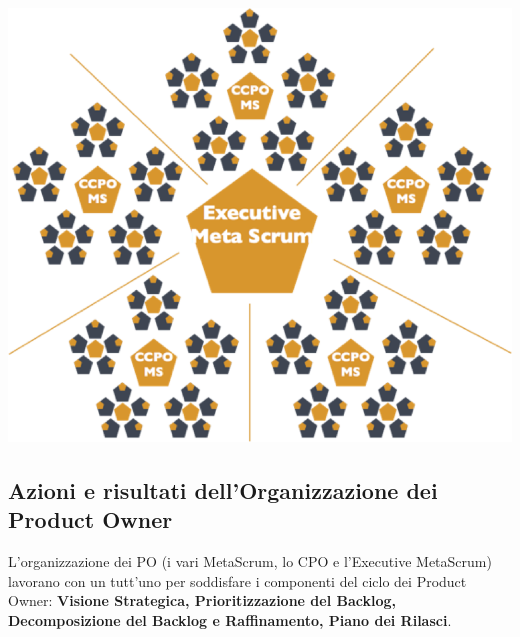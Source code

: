 \documentclass[12pt,a4paper,parskip=full]{scrartcl}
\begin{document}
\includegraphics[width=1.0\linewidth]{ExecMetaScrum.png}

\subsection{Azioni e risultati dell'Organizzazione dei Product Owner}
L'organizzazione dei PO (i vari MetaScrum, lo CPO e l'Executive MetaScrum) lavorano con un tutt'uno per soddisfare i componenti del ciclo dei Product Owner: \textbf{Visione Strategica, Prioritizzazione del Backlog, Decomposizione del Backlog e Raffinamento, Piano dei Rilasci}.
\end{document}
